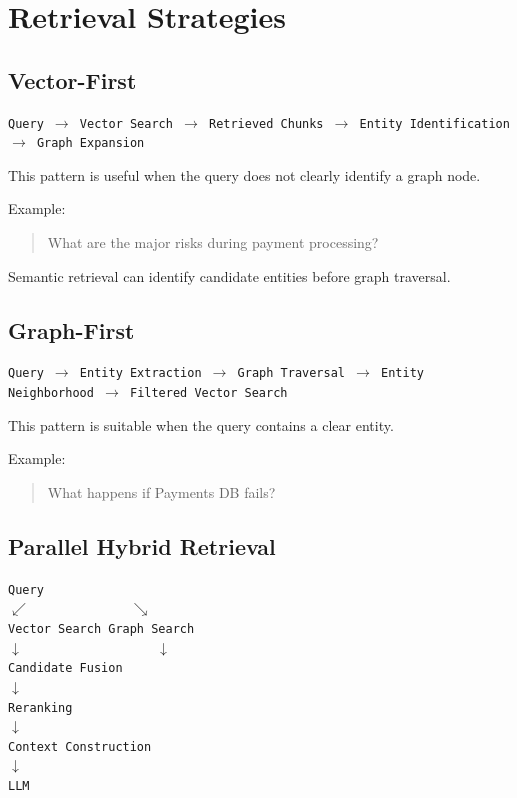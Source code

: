 \documentclass[11pt,a4paper]{article}
\begin{document}
\section{Retrieval Strategies}

\subsection{Vector-First}

\begin{center}
\texttt{Query $\rightarrow$ Vector Search $\rightarrow$ Retrieved Chunks $\rightarrow$ Entity Identification $\rightarrow$ Graph Expansion}
\end{center}

This pattern is useful when the query does not clearly identify a graph node.

Example:

\begin{quote}
What are the major risks during payment processing?
\end{quote}

Semantic retrieval can identify candidate entities before graph traversal.

\subsection{Graph-First}

\begin{center}
\texttt{Query $\rightarrow$ Entity Extraction $\rightarrow$ Graph Traversal $\rightarrow$ Entity Neighborhood $\rightarrow$ Filtered Vector Search}
\end{center}

This pattern is suitable when the query contains a clear entity.

Example:

\begin{quote}
What happens if Payments DB fails?
\end{quote}

\subsection{Parallel Hybrid Retrieval}

\begin{center}
\texttt{Query}\\
$\swarrow \hspace{3cm} \searrow$\\
\texttt{Vector Search \hspace{1cm} Graph Search}\\
$\downarrow \hspace{4cm} \downarrow$\\
\texttt{Candidate Fusion}\\
$\downarrow$\\
\texttt{Reranking}\\
$\downarrow$\\
\texttt{Context Construction}\\
$\downarrow$\\
\texttt{LLM}
\end{center}
\end{document}
